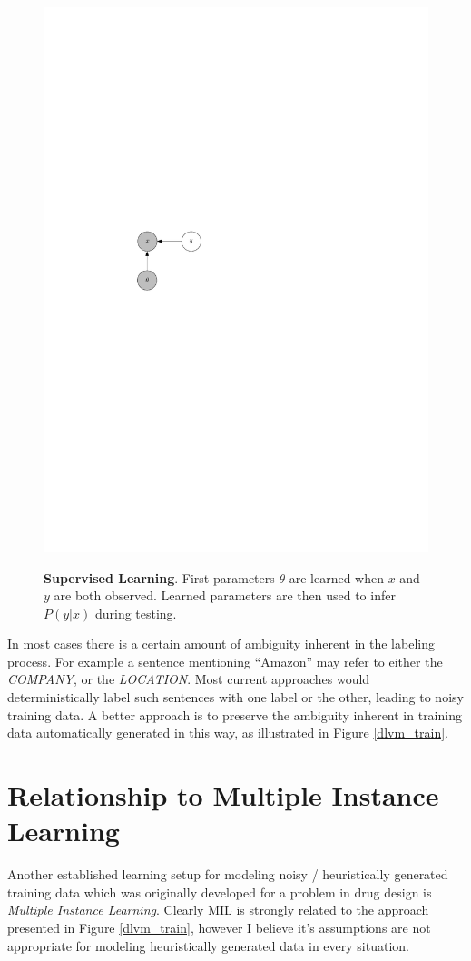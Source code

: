\documentclass[12pt]{article}
\begin{document}
\begin{figure}
{    \includegraphics{supervised_test.pdf}
  }
  \caption{{\bf Supervised Learning}.  First parameters $\theta$ are learned when $x$ and $y$ are both observed.  Learned
  parameters are then used to infer $P(y|x)$ during testing.}
\end{figure}

In most cases there is a certain amount of ambiguity inherent in the labeling process.  For example a sentence mentioning ``Amazon''
may refer to either the {\sl COMPANY}, or the {\sl LOCATION}.  Most current approaches would deterministically label such
sentences with one label or the other, leading to noisy training data.
A better approach is to preserve the ambiguity inherent in training data automatically generated in this way, as illustrated
in Figure \ref{dlvm_train}.

\section{Relationship to Multiple Instance Learning}
Another established learning setup for modeling noisy / heuristically generated training data which was originally developed for 
a problem in drug design is \emph{Multiple Instance Learning}.  Clearly MIL is strongly related to the approach presented in Figure
\ref{dlvm_train}, however I believe it's assumptions are
not appropriate for modeling heuristically generated data in every situation.
\end{document}

